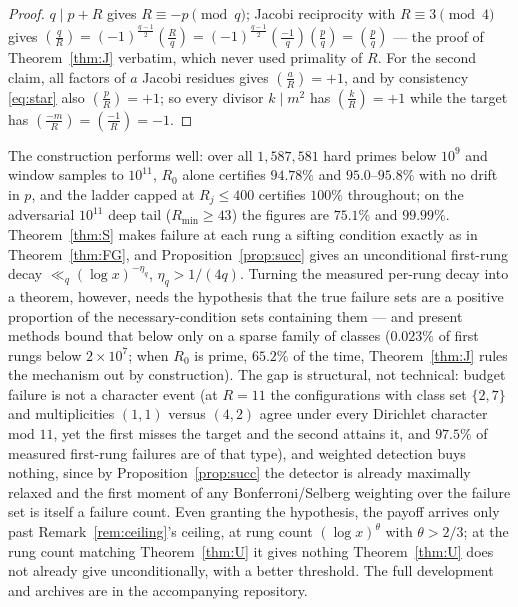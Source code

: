 \documentclass[11pt]{article}
\theoremstyle{plain}
\theoremstyle{remark}
\theoremstyle{plain}
\numberwithin{equation}{section}
\newcommand{\legendre}[2]{\genfrac{(}{)}{}{1}{#1}{#2}}
\begin{document}
\begin{proof}
$q \mid p+R$ gives $R \equiv -p \pmod q$; Jacobi reciprocity with
$R \equiv 3 \pmod 4$ gives
$\legendre{q}{R} = (-1)^{\frac{q-1}{2}}\legendre{R}{q}
 = (-1)^{\frac{q-1}{2}}\legendre{-1}{q}\legendre{p}{q}
 = \legendre{p}{q}$ --- the proof of Theorem~\ref{thm:J} verbatim,
which never used primality of $R$. For the second claim, all factors
of $a$ Jacobi residues gives $\legendre{a}{R} = +1$, and by
consistency \eqref{eq:star} also $\legendre{p}{R} = +1$; so every
divisor $k \mid m^2$ has $\legendre{k}{R} = +1$ while the target has
$\legendre{-m}{R} = \legendre{-1}{R} = -1$.
\end{proof}

The construction performs well: over all $1{,}587{,}581$ hard primes
below $10^9$ and window samples to $10^{11}$, $R_0$ alone certifies
$94.78\%$ and $95.0$--$95.8\%$ with no drift in $p$, and the ladder
capped at $R_j \le 400$ certifies $100\%$ throughout; on the
adversarial $10^{11}$ deep tail ($R_{\min} \ge 43$) the figures are
$75.1\%$ and $99.99\%$. Theorem~\ref{thm:S} makes failure at each rung
a sifting condition exactly as in Theorem~\ref{thm:FG}, and
Proposition~\ref{prop:succ} gives an unconditional first-rung decay
$\ll_q (\log x)^{-\eta_q}$, $\eta_q > 1/(4q)$. Turning the measured
per-rung decay into a theorem, however, needs the hypothesis that the
true failure sets are a positive proportion of the
necessary-condition sets containing them --- and present methods bound
that below only on a sparse family of classes ($0.023\%$ of first
rungs below $2 \times 10^7$; when $R_0$ is prime, $65.2\%$ of the
time, Theorem~\ref{thm:J} rules the mechanism out by construction).
The gap is structural, not technical: budget failure is not a
character event (at $R = 11$ the configurations with class set
$\{2,7\}$ and multiplicities $(1,1)$ versus $(4,2)$ agree under every
Dirichlet character mod $11$, yet the first misses the target and the
second attains it, and $97.5\%$ of measured first-rung failures are of
that type), and weighted detection buys nothing, since by
Proposition~\ref{prop:succ} the detector is already maximally relaxed
and the first moment of any Bonferroni/Selberg weighting over the
failure set is itself a failure count. Even granting the hypothesis,
the payoff arrives only past Remark~\ref{rem:ceiling}'s ceiling, at
rung count $(\log x)^{\theta}$ with $\theta > 2/3$; at the rung count
matching Theorem~\ref{thm:U} it gives nothing Theorem~\ref{thm:U} does
not already give unconditionally, with a better threshold. The full
development and archives are in the accompanying repository.
\end{document}
